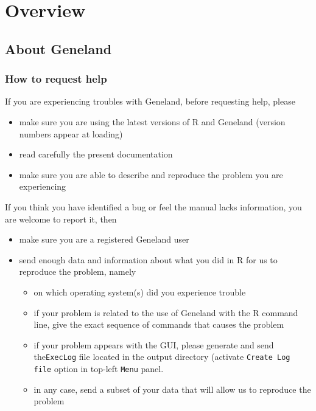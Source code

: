 \documentclass[a4paper,10pt]{article}
\begin{document}

\tableofcontents

\newpage


\section{Overview}
\subsection{About {\sc Geneland}}

\subsubsection{How to request help}
If you are experiencing troubles with {\sc Geneland}, before requesting help, please 
\begin{itemize}
\item make sure you are using the latest  versions of R and {\sc Geneland} (version numbers appear at loading)
\item read carefully the present documentation 
\item make sure you are able to describe and reproduce the problem you are experiencing
\end{itemize}

If you think you have identified a bug or feel the manual lacks information, you are welcome to report it, then
\begin{itemize}

\item make sure you are a registered {\sc Geneland} user
\item  send enough data and information about what you did in R  for us to reproduce the problem, namely
  \begin{itemize}
  \item on which operating system(s) did you experience trouble 
  \item if your problem is related to the use of {\sc Geneland} with the R command line, 
    give the exact sequence of commands that causes the problem
  \item  if your problem appears with the GUI, please generate and send the\texttt{ExecLog} file  
    located in the output directory (activate \texttt{Create Log file} option in top-left \texttt{Menu} panel.
  \item in any case, send a subset of your data that will allow us to reproduce the problem 
  \end{itemize}
\end{itemize}
\end{document}
